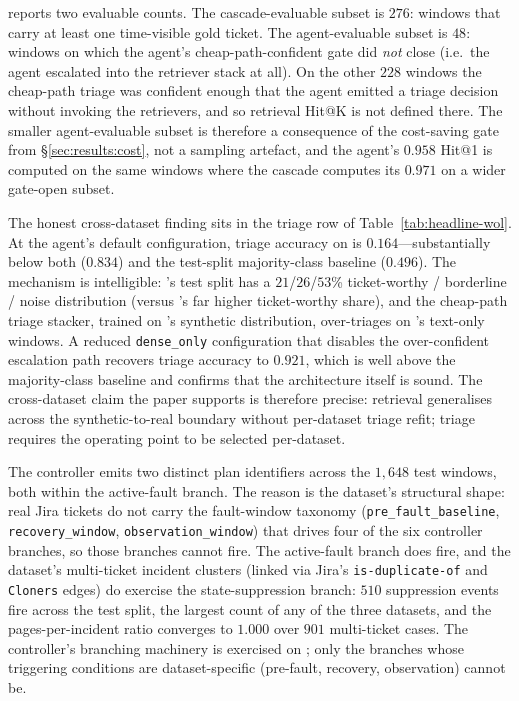  \dswol{} reports two evaluable counts. The cascade-evaluable subset is $276$: windows that carry at least one time-visible gold ticket. The agent-evaluable subset is $48$: windows on which the agent's cheap-path-confident gate did \emph{not} close (i.e.\ the agent escalated into the retriever stack at all). On the other $228$ windows the cheap-path triage was confident enough that the agent emitted a triage decision without invoking the retrievers, and so retrieval Hit@K is not defined there. The smaller agent-evaluable subset is therefore a consequence of the cost-saving gate from \S\ref{sec:results:cost}, not a sampling artefact, and the agent's $0.958$ Hit@1 is computed on the same windows where the cascade computes its $0.971$ on a wider gate-open subset.

 The honest cross-dataset finding sits in the triage row of Table~\ref{tab:headline-wol}. At the agent's default configuration, triage accuracy on \dswol{} is $0.164$---substantially below both \dsob{} ($0.834$) and the test-split majority-class baseline ($0.496$). The mechanism is intelligible: \dswol{}'s test split has a $21$/$26$/$53$\% ticket-worthy / borderline / noise distribution (versus \dsob{}'s far higher ticket-worthy share), and the cheap-path triage stacker, trained on \dsob{}'s synthetic distribution, over-triages on \dswol{}'s text-only windows. A reduced \texttt{dense\_only} configuration that disables the over-confident escalation path recovers triage accuracy to $0.921$, which is well above the majority-class baseline and confirms that the architecture itself is sound. The cross-dataset claim the paper supports is therefore precise: retrieval generalises across the synthetic-to-real boundary without per-dataset triage refit; triage requires the operating point to be selected per-dataset.

 The controller emits two distinct plan identifiers across the $1{,}648$ test windows, both within the active-fault branch. The reason is the dataset's structural shape: real Jira tickets do not carry the fault-window taxonomy (\texttt{pre\_fault\_baseline}, \texttt{recovery\_window}, \texttt{observation\_window}) that drives four of the six controller branches, so those branches cannot fire. The active-fault branch does fire, and the dataset's multi-ticket incident clusters (linked via Jira's \texttt{is-duplicate-of} and \texttt{Cloners} edges) do exercise the state-suppression branch: $510$ suppression events fire across the test split, the largest count of any of the three datasets, and the pages-per-incident ratio converges to $1.000$ over $901$ multi-ticket cases. The controller's branching machinery is exercised on \dswol{}; only the branches whose triggering conditions are dataset-specific (pre-fault, recovery, observation) cannot be.

